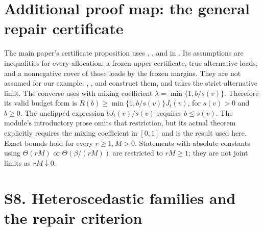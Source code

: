 \section*{Additional proof map: the general repair certificate}
The main paper's certificate proposition uses , ,
 and  in .
Its assumptions are inequalities for every allocation: a frozen upper certificate, true
alternative loads, and a nonnegative cover of those loads by the frozen margins.
They are not assumed for our example: , ,
 and  construct them, and
 takes the strict-alternative limit.
The converse uses  with mixing coefficient
$\lambda=\min\{1,b/s(v)\}$. Therefore its valid budget form is
$R(b)\ge\min\{1,b/s(v)\}J_t(v)$, for $s(v)>0$ and $b\ge0$.
The unclipped expression $bJ_t(v)/s(v)$ requires $b\le s(v)$.
The module's introductory prose omits that restriction, but its actual theorem explicitly
requires the mixing coefficient in $[0,1]$ and is the result used here.
Exact bounds hold for every $r\ge1,M>0$. Statements with absolute constants using
$\Theta(rM)$ or $\Theta(\beta/(rM))$ are restricted to $rM\ge1$; they are not joint limits
as $rM\downarrow0$.

\section{S8. Heteroscedastic families and the repair criterion}

